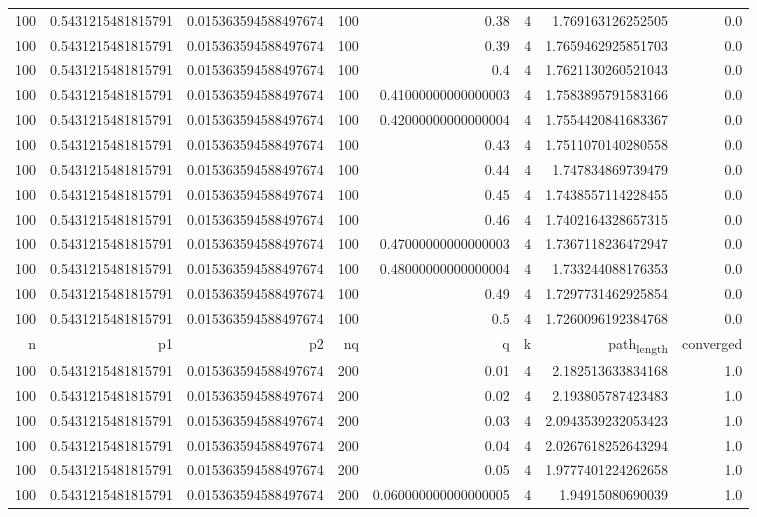\documentclass[11pt]{article}
\begin{document}
\begin{center}
\begin{tabular}{rrrrrrrr}
100 & 0.5431215481815791 & 0.015363594588497674 & 100 & 0.38 & 4 & 1.769163126252505 & 0.0\\
100 & 0.5431215481815791 & 0.015363594588497674 & 100 & 0.39 & 4 & 1.7659462925851703 & 0.0\\
100 & 0.5431215481815791 & 0.015363594588497674 & 100 & 0.4 & 4 & 1.7621130260521043 & 0.0\\
100 & 0.5431215481815791 & 0.015363594588497674 & 100 & 0.41000000000000003 & 4 & 1.7583895791583166 & 0.0\\
100 & 0.5431215481815791 & 0.015363594588497674 & 100 & 0.42000000000000004 & 4 & 1.7554420841683367 & 0.0\\
100 & 0.5431215481815791 & 0.015363594588497674 & 100 & 0.43 & 4 & 1.7511070140280558 & 0.0\\
100 & 0.5431215481815791 & 0.015363594588497674 & 100 & 0.44 & 4 & 1.747834869739479 & 0.0\\
100 & 0.5431215481815791 & 0.015363594588497674 & 100 & 0.45 & 4 & 1.7438557114228455 & 0.0\\
100 & 0.5431215481815791 & 0.015363594588497674 & 100 & 0.46 & 4 & 1.7402164328657315 & 0.0\\
100 & 0.5431215481815791 & 0.015363594588497674 & 100 & 0.47000000000000003 & 4 & 1.7367118236472947 & 0.0\\
100 & 0.5431215481815791 & 0.015363594588497674 & 100 & 0.48000000000000004 & 4 & 1.733244088176353 & 0.0\\
100 & 0.5431215481815791 & 0.015363594588497674 & 100 & 0.49 & 4 & 1.7297731462925854 & 0.0\\
100 & 0.5431215481815791 & 0.015363594588497674 & 100 & 0.5 & 4 & 1.7260096192384768 & 0.0\\
\hline
n & p1 & p2 & nq & q & k & path\textsubscript{length} & converged\\
\hline
100 & 0.5431215481815791 & 0.015363594588497674 & 200 & 0.01 & 4 & 2.182513633834168 & 1.0\\
100 & 0.5431215481815791 & 0.015363594588497674 & 200 & 0.02 & 4 & 2.193805787423483 & 1.0\\
100 & 0.5431215481815791 & 0.015363594588497674 & 200 & 0.03 & 4 & 2.0943539232053423 & 1.0\\
100 & 0.5431215481815791 & 0.015363594588497674 & 200 & 0.04 & 4 & 2.0267618252643294 & 1.0\\
100 & 0.5431215481815791 & 0.015363594588497674 & 200 & 0.05 & 4 & 1.9777401224262658 & 1.0\\
100 & 0.5431215481815791 & 0.015363594588497674 & 200 & 0.060000000000000005 & 4 & 1.94915080690039 & 1.0\\

\end{tabular}
\end{center}
\end{document}

